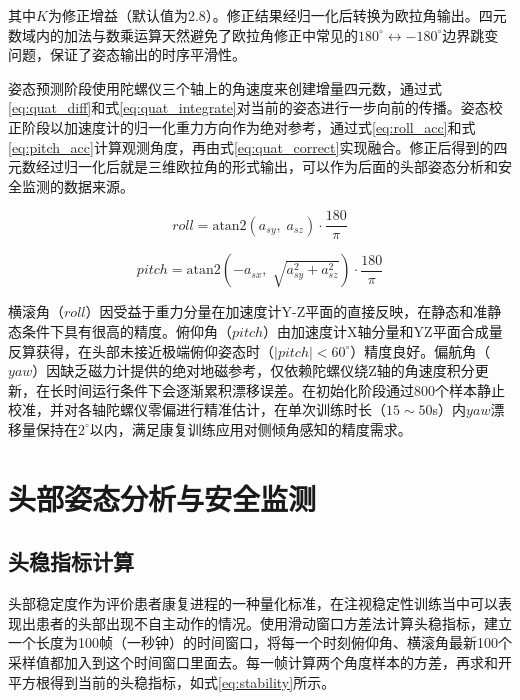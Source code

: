 其中$K$为修正增益（默认值为2.8）。修正结果经归一化后转换为欧拉角输出。四元数域内的加法与数乘运算天然避免了欧拉角修正中常见的$180^\circ \leftrightarrow -180^\circ$边界跳变问题，保证了姿态输出的时序平滑性。

姿态预测阶段使用陀螺仪三个轴上的角速度来创建增量四元数，通过式\ref{eq:quat_diff}和式\ref{eq:quat_integrate}对当前的姿态进行一步向前的传播。姿态校正阶段以加速度计的归一化重力方向作为绝对参考，通过式\ref{eq:roll_acc}和式\ref{eq:pitch_acc}计算观测角度，再由式\ref{eq:quat_correct}实现融合。修正后得到的四元数经过归一化后就是三维欧拉角的形式输出，可以作为后面的头部姿态分析和安全监测的数据来源。

\begin{equation}
roll = \text{atan2}(a_{sy},\; a_{sz}) \cdot \frac{180}{\pi}
\label{eq:roll_acc}
\end{equation}

\begin{equation}
pitch = \text{atan2}(-a_{sx},\; \sqrt{a_{sy}^2 + a_{sz}^2}) \cdot \frac{180}{\pi}
\label{eq:pitch_acc}
\end{equation}

横滚角（$roll$）因受益于重力分量在加速度计Y-Z平面的直接反映，在静态和准静态条件下具有很高的精度。俯仰角（$pitch$）由加速度计X轴分量和YZ平面合成量反算获得，在头部未接近极端俯仰姿态时（$|pitch| < 60^\circ$）精度良好。偏航角（$yaw$）因缺乏磁力计提供的绝对地磁参考，仅依赖陀螺仪绕Z轴的角速度积分更新，在长时间运行条件下会逐渐累积漂移误差。在初始化阶段通过800个样本静止校准，并对各轴陀螺仪零偏进行精准估计，在单次训练时长（$15\sim50$s）内$yaw$漂移量保持在$2^\circ$以内，满足康复训练应用对侧倾角感知的精度需求。


\section{头部姿态分析与安全监测}

\subsection{头稳指标计算}

头部稳定度作为评价患者康复进程的一种量化标准，在注视稳定性训练当中可以表现出患者的头部出现不自主动作的情况。使用滑动窗口方差法计算头稳指标，建立一个长度为100帧（一秒钟）的时间窗口，将每一个时刻俯仰角、横滚角最新100个采样值都加入到这个时间窗口里面去。每一帧计算两个角度样本的方差，再求和开平方根得到当前的头稳指标，如式\ref{eq:stability}所示。


